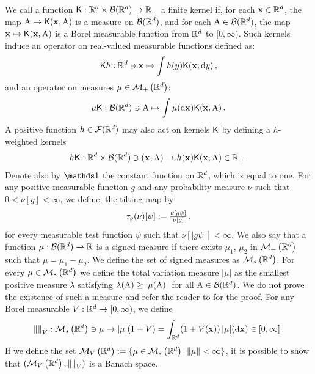 \documentclass[11pt]{article}
\theoremstyle{plain}
\theoremstyle{definition}
\theoremstyle{remark}
\begin{document}
We call a function $\mathsf{K} : \mathbb{R}^{d} \times \mathcal{B}(\mathbb{R}^d) \to \mathbb{R}_{+}$ a finite kernel if, for each $\mathbf{x} \in \mathbb{R}^d$, the map 
$\mathrm{A} \mapsto \mathsf{K}(\mathbf{x},\mathrm{A})$ is a measure on $\mathcal{B}(\mathbb{R}^d)$, and for each $\mathrm{A} \in \mathcal{B}(\mathbb{R}^d)$, the map $\mathbf{x} \mapsto \mathsf{K}(\mathbf{x},\mathrm{A})$ is a Borel measurable function from $\mathbb{R}^d$ to $[0, \infty)$. Such kernels induce an operator on real-valued measurable functions defined as:
\begin{align*}
    \mathsf{K} h : \mathbb{R}^{d} \ni \mathbf{x} \mapsto \int h(y) \mathsf{K} (\mathbf{x},\mathrm{d} y) \,,
\end{align*}
and an operator on measures $\mu \in \mathcal{M}_{+}\left(\mathbb{R}^d\right)$:
\begin{align*}
    \mu \mathsf{K} : \mathcal{B}(\mathbb{R}^d) \ni \mathrm{A} \mapsto \int \mu(\mathrm{d} \mathbf{x}) \mathsf{K} (\mathbf{x},\mathrm{A}) \,. 
\end{align*}
A positive function $h \in \mathcal{F}(\mathbb{R}^d)$ may also act on kernels $\mathsf{K}$ by defining a $h$-weighted kernels
\begin{align*}
    h \mathsf{K}: \mathbb{R}^d \times \mathcal{B}(\mathbb{R}^d) \ni (\mathbf{x}, \mathrm{A}) \rightarrow h(\mathbf{x}) \mathsf{K}(\mathbf{x}, \mathrm{A}) \in \mathbb{R}_{+} \,.
\end{align*}
Denote also by $\un$ the constant function on $\mathbb{R}^d$, which is equal to one. For any positive measurable function $g$ and any probability measure $\nu$ such that $0<\nu[g]<\infty$, we define, the tilting map by
$$
\tau_g(\nu)[\psi]
:=
\tfrac{\nu[g\psi]}{\nu[g]} \,,
$$
for every measurable test function \(\psi\) such that \(\nu[|g\psi|]<\infty\). We also say that a function $\mu: \mathcal{B}(\mathbb{R}^d) \rightarrow \mathbb{R}$ is a signed-measure if there exists $\mu_1$, $\mu_2$ in $\mathcal{M}_{+}\left(\mathbb{R}^d\right)$ such that $\mu = \mu_1 - \mu_2$.
We define the set of signed measures as $\mathcal{M}_s\left(\mathbb{R}^d\right)$. For every $\mu \in \mathcal{M}_s\left(\mathbb{R}^d\right)$ we define the total variation measure $|\mu|$ as the smallest positive measure $\lambda$ satisfying $\lambda(\mathrm{A}) \geq |\mu(\mathrm{A})|$ for all $\mathrm{A} \in \mathcal{B}(\mathbb{R}^d)$. We do not prove the existence of such a measure and refer the reader to \cite[Chapter 6]{rudin1987real} for the proof.
For any Borel measurable $V: \mathbb{R}^{d} \rightarrow [0, \infty)$, we define 
\begin{equation}
    \label{eq:def:rho_b}
    \vnorm: \signedmeasures{\rset^\xdim} \ni \mu \rightarrow |\mu|(1+V) = \int_{\rset^\xdim}(1+V(\x))\,|\mu|(\rmd \x)
 \in [0, \infty]\eqsp.
\end{equation}
If we define the set $\vsignedmeasures{\rset^\xdim} \eqdef \{\mu \in \signedmeasures{\rset^\xdim} | \vnorm[\mu][] < \infty\}$, it is possible to show \cite[Proposition D.3.3]{douc2018markov} that $ (\vsignedmeasures{\rset^\xdim}, \vnorm)$ is a Banach space.
\end{document}
